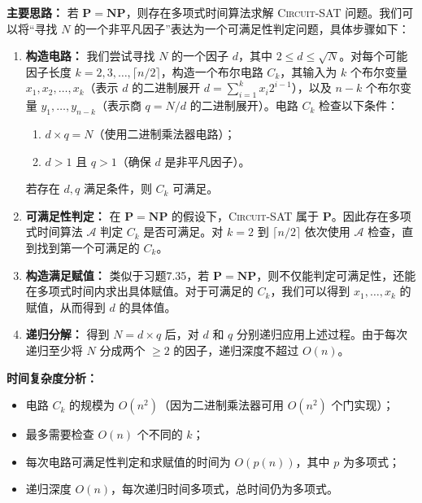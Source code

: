 \documentclass[11pt,addpoints,answers]{exam}
\begin{document}
\begin{questions}
\begin{solution}
    \textbf{主要思路：} 若 $\mathbf{P} = \mathbf{NP}$，则存在多项式时间算法求解 \textsc{Circuit-SAT} 问题。我们可以将“寻找 $N$ 的一个非平凡因子”表达为一个可满足性判定问题，具体步骤如下：
    
    \begin{enumerate}
        \item \textbf{构造电路：} 我们尝试寻找 $N$ 的一个因子 $d$，其中 $2 \leq d \leq \sqrt{N}$。对每个可能因子长度 $k = 2, 3, \dots, \lceil n/2 \rceil$，构造一个布尔电路 $C_k$，其输入为 $k$ 个布尔变量 $x_1, x_2, \dots, x_k$（表示 $d$ 的二进制展开 $d = \sum_{i=1}^k x_i 2^{i-1}$），以及 $n-k$ 个布尔变量 $y_1, \dots, y_{n-k}$（表示商 $q = N/d$ 的二进制展开）。电路 $C_k$ 检查以下条件：
        \begin{enumerate}
            \item $d \times q = N$（使用二进制乘法器电路）；
            \item $d > 1$ 且 $q > 1$（确保 $d$ 是非平凡因子）。
        \end{enumerate}
        若存在 $d, q$ 满足条件，则 $C_k$ 可满足。
        
        \item \textbf{可满足性判定：} 在 $\mathbf{P} = \mathbf{NP}$ 的假设下，\textsc{Circuit-SAT} 属于 $\mathbf{P}$。因此存在多项式时间算法 $\mathcal{A}$ 判定 $C_k$ 是否可满足。对 $k=2$ 到 $\lceil n/2 \rceil$ 依次使用 $\mathcal{A}$ 检查，直到找到第一个可满足的 $C_k$。
        
        \item \textbf{构造满足赋值：} 类似于习题7.35，若 $\mathbf{P} = \mathbf{NP}$，则不仅能判定可满足性，还能在多项式时间内求出具体赋值。对于可满足的 $C_k$，我们可以得到 $x_1,\dots,x_k$ 的赋值，从而得到 $d$ 的具体值。
        
        \item \textbf{递归分解：} 得到 $N = d \times q$ 后，对 $d$ 和 $q$ 分别递归应用上述过程。由于每次递归至少将 $N$ 分成两个 $\geq 2$ 的因子，递归深度不超过 $O(n)$。
    \end{enumerate}
    
    \textbf{时间复杂度分析：}
    \begin{itemize}
        \item 电路 $C_k$ 的规模为 $O(n^2)$（因为二进制乘法器可用 $O(n^2)$ 个门实现）；
        \item 最多需要检查 $O(n)$ 个不同的 $k$；
        \item 每次电路可满足性判定和求赋值的时间为 $O(p(n))$，其中 $p$ 为多项式；
        \item 递归深度 $O(n)$，每次递归时间多项式，总时间仍为多项式。
    \end{itemize}
    

\end{solution}
\end{questions}
\end{document}
